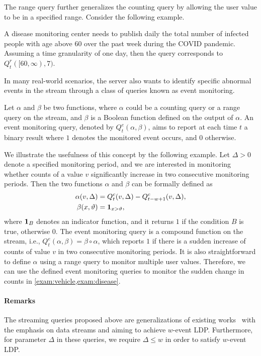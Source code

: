 The range query further generalizes the counting query by allowing the user value to
be in a specified range.
Consider the following example.

\begin{example}\label{exam:disease}
  A disease monitoring center needs to publish daily the total number of
  infected people with age above $60$ over the past week during the COVID
  pandemic.
  Assuming a time granularity of one day, then the query corresponds to $Q_t^r([60,
  \infty), 7)$.
\end{example}

In many real-world scenarios, the server also wants to identify specific
abnormal events in the stream through a class of queries known as event
monitoring.

\begin{definition}\label{def:event_monitoring}
  Let $\alpha$ and $\beta$ be two functions, where $\alpha$ could be a counting
  query or a range query on the stream, and $\beta$ is a Boolean function defined
  on the output of $\alpha$.
  An event monitoring query, denoted by $Q_t^e(\alpha,\beta)$, aims to report at
  each time $t$ a binary result where $1$ denotes the monitored event occurs,
  and $0$ otherwise.
\end{definition}

We illustrate the usefulness of this concept by the following example.
Let $\Delta>0$ denote a specified monitoring period, and we are interested in
monitoring whether counts of a value $v$ significantly increase in two
consecutive monitoring periods.
Then the two functions $\alpha$ and $\beta$ can be formally defined as
\begin{align*}
  \alpha(v,\Delta) &= Q_t^c(v, \Delta) - Q_{t-w+1}^c(v, \Delta), \\
  \beta(x,\vartheta) &= \mathbf{1}_{x>\vartheta},
\end{align*}
where $\mathbf{1}_{B}$ denotes an indicator function, and it returns $1$ if the
condition $B$ is true, otherwise $0$.
The event monitoring query is a compound function on the stream, i.e.,
$Q_t^e(\alpha,\beta)= \beta\circ\alpha$, which reports $1$ if there is a sudden
increase of counts of value $v$ in two consecutive monitoring periods.
It is also straightforward to define $\alpha$ using a range query to monitor
multiple user values.
Therefore, we can use the defined event monitoring queries to monitor the sudden
change in counts in \cref{exam:vehicle,exam:disease}.

\paragraph{Remarks}
The streaming queries proposed above are generalizations of existing
works~\cite{Kellaris2014,Chen2017} with the emphasis on data streams and aiming
to achieve $w$-event LDP.
Furthermore, for parameter $\Delta$ in these queries, we require $\Delta \leq w$
in order to satisfy $w$-event LDP.
